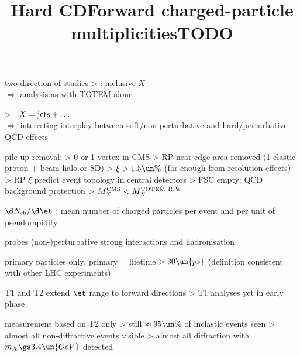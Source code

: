 \> two direction of studies
\>> : inclusive $X$\\
$\Rightarrow$ analysis as with TOTEM alone

\>> : $X = \hbox{jets} + \ldots$\\
$\Rightarrow$ interesting interplay between soft/non-perturbative and hard/perturbative QCD effects


\newpage %
\title{Hard CD}

\vskip-3mm


\vskip-5mm
\> pile-up removal:
\>> 0 or 1 vertex in CMS
\>> RP near edge area removed (1 elastic proton + beam halo or SD)
\>> $\xi > 1.5\un{\%}$ (far enough from resolution effects)
\>> RP $\xi$ predict event topology in central detectors
\>> FSC empty: QCD background protection
\>> $M_X^{\rm CMS} < M_X^{\rm TOTEM\ RPs}$

\newpage %
\hbox{}
\vfil
\title{Forward charged-particle multiplicities}



\newpage %
\title{TODO}

\> $\d N_{\rm ch} / \d\et$ : mean number of charged particles per event and per unit of pseudorapidity

\> probes (non-)perturbative strong interactions and hadronisation 

\> primary particles only: primary = lifetime $> 30\un{ps}$ (definition consistent with other LHC experiments)

\> T1 and T2 extend $\et$ range to forward directions
\>> T1 analyses yet in early phase

\> measurement based on T2 only
\>> still $\approx 95\un{\%}$ of inelastic events seen
\>> almost all non-diffractive events visible
\>> almost all diffraction with $m_X \gs 3.4\un{GeV}$ detected

